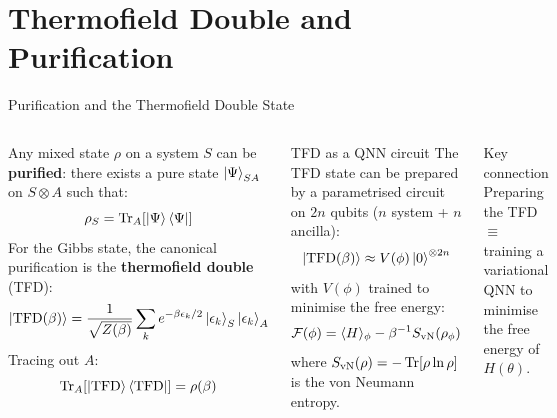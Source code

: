 \documentclass[aspectratio=169,10pt]{beamer}
\begin{document}
\section{Thermofield Double and Purification}

\begin{frame}{Purification and the Thermofield Double State}
  \begin{columns}[T]
      Any mixed state $\rho$ on a system $S$ can be
      \textbf{purified}: there exists a pure state
      $\ket{\Psi}_{SA}$ on $S\otimes A$ such that:
      \[
        \rho_S = \Tr_A\!\left[\ket{\Psi}\bra{\Psi}\right]
      \]
      For the Gibbs state, the canonical purification is the
      \textbf{thermofield double} (TFD):
      \[
        \ket{\mathrm{TFD}(\beta)}
        = \frac{1}{\sqrt{Z(\beta)}}
          \sum_k e^{-\beta\epsilon_k/2}\ket{\epsilon_k}_S\ket{\epsilon_k}_A
      \]
      Tracing out $A$:
      \[
        \Tr_A\!\left[\ket{\mathrm{TFD}}\bra{\mathrm{TFD}}\right]
        = \rho(\beta)
      \]
      \begin{block}{TFD as a QNN circuit}
        The TFD state can be prepared by a parametrised circuit
        on $2n$ qubits ($n$ system + $n$ ancilla):
        \[
          \ket{\mathrm{TFD}(\beta)} \approx V(\phi)\ket{0}^{\otimes 2n}
        \]
        with $V(\phi)$ trained to minimise the free energy:
        \[
          \mathcal{F}(\phi) = \langle H\rangle_\phi
                             - \beta^{-1}S_{\rm vN}(\rho_\phi)
        \]
        where $S_{\rm vN}(\rho) = -\Tr[\rho\ln\rho]$ is the
        von Neumann entropy.
      \end{block}
      \vspace{0.2cm}
      \begin{alertblock}{Key connection}
        Preparing the TFD $\equiv$ training a variational QNN
        to minimise the free energy of $H(\theta)$.
      \end{alertblock}
  \end{columns}
\end{frame}
\end{document}
